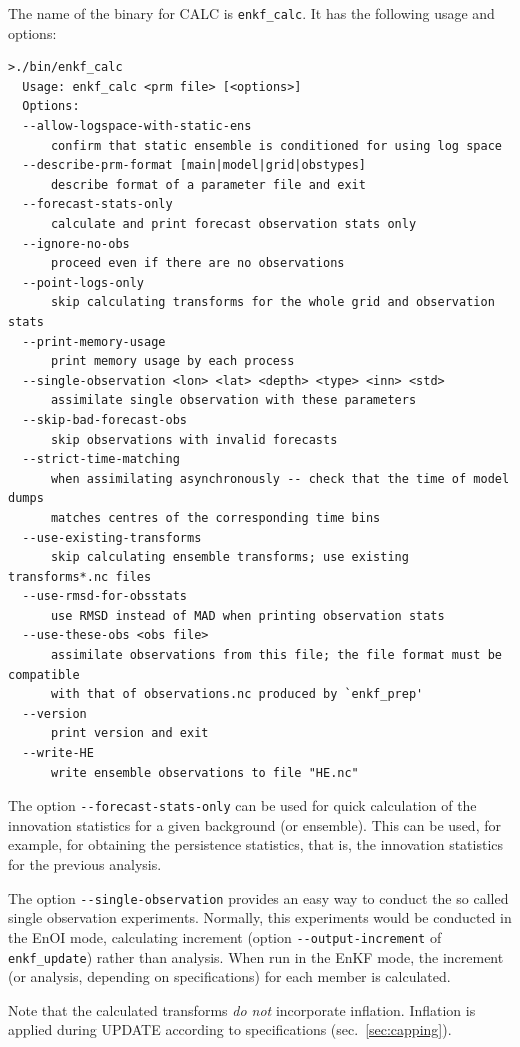 \documentclass[11pt]{report}
\begin{document}
The name of the binary for CALC is \verb|enkf_calc|.
It has the following usage and options:
\begin{Verbatim}[frame=single,fontsize=\footnotesize]
>./bin/enkf_calc 
  Usage: enkf_calc <prm file> [<options>]
  Options:
  --allow-logspace-with-static-ens
      confirm that static ensemble is conditioned for using log space
  --describe-prm-format [main|model|grid|obstypes]
      describe format of a parameter file and exit
  --forecast-stats-only
      calculate and print forecast observation stats only
  --ignore-no-obs
      proceed even if there are no observations
  --point-logs-only
      skip calculating transforms for the whole grid and observation stats
  --print-memory-usage
      print memory usage by each process
  --single-observation <lon> <lat> <depth> <type> <inn> <std>
      assimilate single observation with these parameters
  --skip-bad-forecast-obs
      skip observations with invalid forecasts
  --strict-time-matching
      when assimilating asynchronously -- check that the time of model dumps
      matches centres of the corresponding time bins
  --use-existing-transforms
      skip calculating ensemble transforms; use existing transforms*.nc files
  --use-rmsd-for-obsstats
      use RMSD instead of MAD when printing observation stats
  --use-these-obs <obs file>
      assimilate observations from this file; the file format must be compatible
      with that of observations.nc produced by `enkf_prep'
  --version
      print version and exit
  --write-HE
      write ensemble observations to file "HE.nc"
\end{Verbatim}

The option \verb|--forecast-stats-only| can be used for quick calculation of the innovation statistics for a given background (or ensemble).
This can be used, for example, for obtaining the persistence statistics, that is, the innovation statistics for the previous analysis.

The option \verb|--single-observation| provides an easy way to conduct the so called single observation experiments.
Normally, this experiments would be conducted in the EnOI mode, calculating increment (option \verb|--output-increment| of \verb|enkf_update|) rather than analysis.
When run in the EnKF mode, the increment (or analysis, depending on specifications) for each member is calculated.

Note that the calculated transforms \emph{do not} incorporate inflation.
Inflation is applied during UPDATE according to specifications (sec.~\ref{sec:capping}).
\end{document}
